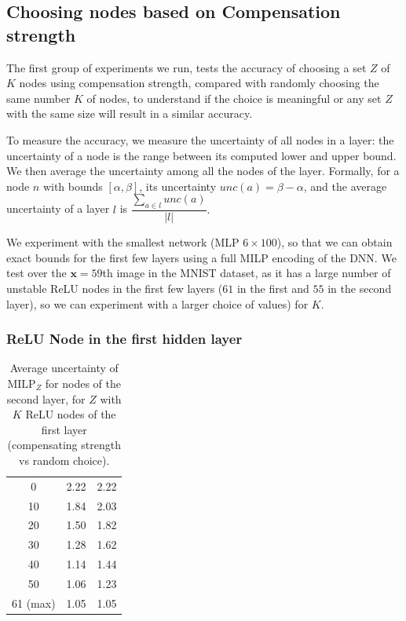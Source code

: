 \documentclass{llncs}
\newcommand{\vx}{\boldsymbol{x}}
\newcommand{\MILP}{{\textrm{MILP}}}
\begin{document}
\subsection{Choosing nodes based on Compensation strength}

The first group of experiments we run, tests the accuracy of choosing a set $Z$ of $K$ nodes using compensation strength, compared with randomly choosing the same number $K$ of nodes, to understand if the choice is meaningful or any set $Z$ with the same size will result in a similar accuracy.

To measure the accuracy, we measure the uncertainty of all nodes in a layer:
the uncertainty of a node is the range between its computed lower and upper bound. 
We then average the uncertainty among all the nodes of the layer.
Formally, for a node $n$ with bounds $[\alpha,\beta]$, its uncertainty $unc(a) = \beta - \alpha$, and the average uncertainty of a layer $l$ is $\dfrac{\sum_{a\in l} unc(a)}{|l|}.$

We experiment with the smallest network (MLP $6\times 100$), so that we can obtain exact bounds for the first few layers using a full MILP encoding of the DNN. We test over the $\vx=59$th image in the MNIST dataset, as it has a large number of unstable ReLU nodes in the first few layers ($61$ in the first and $55$ in the second layer), so we can experiment with a larger choice of values) for $K$.

\subsubsection*{ReLU Node in the first hidden layer}


\begin{table}[b!]
	\centering
	\begin{tabular}{|c||c|c|}
	\hline
	\text{Number $K$ of nodes in $Z$}  &  \text{Compensate strength} & \text{Random Choice}  \\ \hline
	\hline
	0  &  2.22 & 2.22  \\ \hline
	10  &  1.84 & 2.03  \\ \hline
	20  &  1.50 & 1.82  \\ \hline
	30  &  1.28 & 1.62  \\ \hline
	40  &  1.14 & 1.44  \\ \hline
	50  &  1.06 & 1.23  \\ \hline
	61 (max) & 1.05 &  1.05 \\ \hline
\end{tabular}
\caption{Average uncertainty of $\MILP_Z$ for nodes of the second layer, for $Z$ with $K$ ReLU nodes of the first layer (compensating strength vs random choice).}
\label{tab:example0}
\vspace{-0.8cm}
\end{table}
\end{document}
